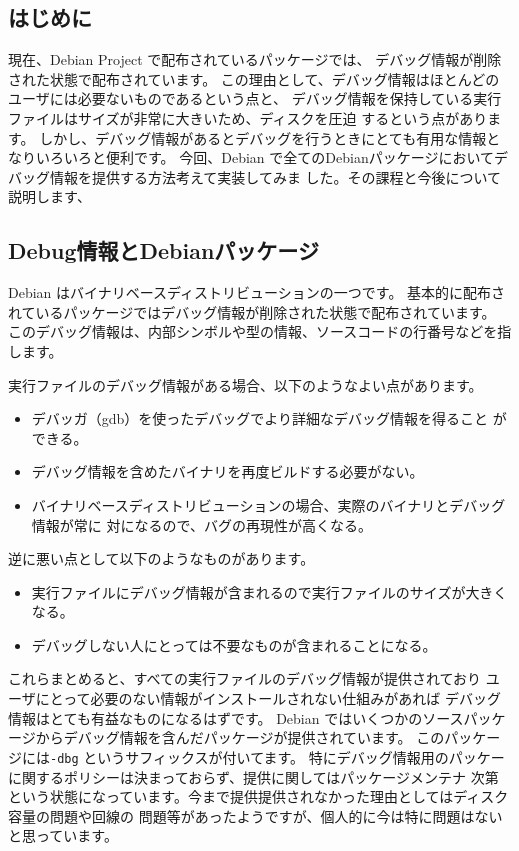 \documentclass[mingoth,a4paper]{jsarticle}
\begin{document}
\label{sec:debug}

\subsection{はじめに}
現在、Debian Project で配布されているパッケージでは、
デバッグ情報が削除された状態で配布されています。
この理由として、デバッグ情報はほとんどのユーザには必要ないものであるという点と、
デバッグ情報を保持している実行ファイルはサイズが非常に大きいため、ディスクを圧迫
するという点があります。
しかし、デバッグ情報があるとデバッグを行うときにとても有用な情報となりいろいろと便利です。
今回、Debian で全てのDebianパッケージにおいてデバッグ情報を提供する方法考えて実装してみま
した。その課程と今後について説明します、

\subsection{Debug情報とDebianパッケージ}
Debian はバイナリベースディストリビューションの一つです。
基本的に配布されているパッケージではデバッグ情報が削除された状態で配布されています。
このデバッグ情報は、内部シンボルや型の情報、ソースコードの行番号などを指します。

実行ファイルのデバッグ情報がある場合、以下のようなよい点があります。
\begin{itemize}
\item デバッガ（gdb）を使ったデバッグでより詳細なデバッグ情報を得ること
ができる。
\item デバッグ情報を含めたバイナリを再度ビルドする必要がない。
\item バイナリベースディストリビューションの場合、実際のバイナリとデバッグ情報が常に
対になるので、バグの再現性が高くなる。
\end{itemize}

逆に悪い点として以下のようなものがあります。

\begin{itemize}
\item 実行ファイルにデバッグ情報が含まれるので実行ファイルのサイズが大きくなる。
\item デバッグしない人にとっては不要なものが含まれることになる。
\end{itemize}

これらまとめると、すべての実行ファイルのデバッグ情報が提供されており
ユーザにとって必要のない情報がインストールされない仕組みがあれば
デバッグ情報はとても有益なものになるはずです。
Debian ではいくつかのソースパッケージからデバッグ情報を含んだパッケージが提供されています。
このパッケージには\texttt{-dbg} というサフィックスが付いてます。
特にデバッグ情報用のパッケーに関するポリシーは決まっておらず、提供に関してはパッケージメンテナ
次第という状態になっています。今まで提供提供されなかった理由としてはディスク容量の問題や回線の
問題等があったようですが、個人的に今は特に問題はないと思っています。
\end{document}
